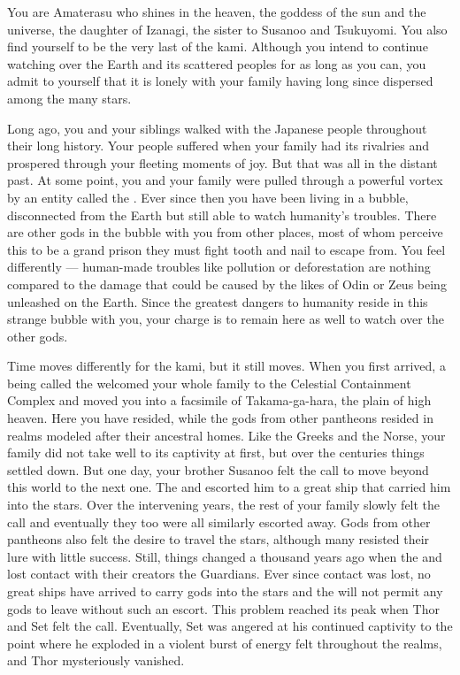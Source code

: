 \documentclass[char]{guardians}
\begin{document}
\name{\cAmaterasu{}}

You are Amaterasu who shines in the heaven, the goddess of the sun and the universe, the daughter of Izanagi, the sister to Susanoo and Tsukuyomi. You also find yourself to be the very last of the kami. Although you intend to continue watching over the Earth and its scattered peoples for as long as you can, you admit to yourself that it is lonely with your family having long since dispersed among the many stars.

Long ago, you and your siblings walked with the Japanese people throughout their long history. Your people suffered when your family had its rivalries and prospered through your fleeting moments of joy. But that was all in the distant past. At some point, you and your family were pulled through a powerful vortex by an entity called the \cWarden{}. Ever since then you have been living in a bubble, disconnected from the Earth but still able to watch humanity's troubles. There are other gods in the bubble with you from other places, most of whom perceive this to be a grand prison they must fight tooth and nail to escape from. You feel differently --- human-made troubles like pollution or deforestation are nothing compared to the damage that could be caused by the likes of Odin or Zeus being unleashed on the Earth. Since the greatest dangers to humanity reside in this strange bubble with you, your charge is to remain here as well to watch over the other gods.

Time moves differently for the kami, but it still moves. When you first arrived, a being called the \cCaretaker{} welcomed your whole family to the Celestial Containment Complex and moved you into a facsimile of Takama-ga-hara, the plain of high heaven. Here you have resided, while the gods from other pantheons resided in realms modeled after their ancestral homes. Like the Greeks and the Norse, your family did not take well to its captivity at first, but over the centuries things settled down. But one day, your brother Susanoo felt the call to move beyond this world to the next one. The \cCaretaker{} and \cWarden{} escorted him to a great ship that carried him into the stars. Over the intervening years, the rest of your family slowly felt the call and eventually they too were all similarly escorted away. Gods from other pantheons also felt the desire to travel the stars, although many resisted their lure with little success. Still, things changed a thousand years ago when the \cCaretaker{} and \cWarden{} lost contact with their creators the Guardians. Ever since contact was lost, no great ships have arrived to carry gods into the stars and the \cWarden{} will not permit any gods to leave without such an escort. This problem reached its peak when Thor and Set felt the call. Eventually, Set was angered at his continued captivity to the point where he exploded in a violent burst of energy felt throughout the realms, and Thor mysteriously vanished.
\end{document}
